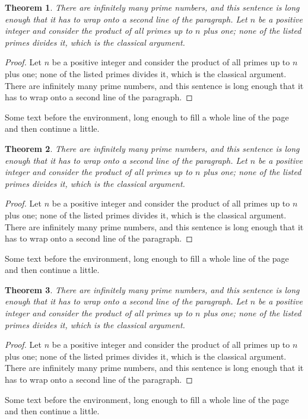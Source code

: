 \documentclass{article}
\newtheorem{theorem}{Theorem}
\begin{document}
\begin{theorem}
There are infinitely many prime numbers, and this sentence is long enough that it has to wrap onto a second line of the paragraph. Let $n$ be a positive integer and consider the product of all primes up to $n$ plus one; none of the listed primes divides it, which is the classical argument.
\end{theorem}
\begin{proof}
Let $n$ be a positive integer and consider the product of all primes up to $n$ plus one; none of the listed primes divides it, which is the classical argument. There are infinitely many prime numbers, and this sentence is long enough that it has to wrap onto a second line of the paragraph.
\end{proof}
Some text before the environment, long enough to fill a whole line of the page and then continue a little.

\begin{theorem}
There are infinitely many prime numbers, and this sentence is long enough that it has to wrap onto a second line of the paragraph. Let $n$ be a positive integer and consider the product of all primes up to $n$ plus one; none of the listed primes divides it, which is the classical argument.
\end{theorem}
\begin{proof}
Let $n$ be a positive integer and consider the product of all primes up to $n$ plus one; none of the listed primes divides it, which is the classical argument. There are infinitely many prime numbers, and this sentence is long enough that it has to wrap onto a second line of the paragraph.
\end{proof}
Some text before the environment, long enough to fill a whole line of the page and then continue a little.

\begin{theorem}
There are infinitely many prime numbers, and this sentence is long enough that it has to wrap onto a second line of the paragraph. Let $n$ be a positive integer and consider the product of all primes up to $n$ plus one; none of the listed primes divides it, which is the classical argument.
\end{theorem}
\begin{proof}
Let $n$ be a positive integer and consider the product of all primes up to $n$ plus one; none of the listed primes divides it, which is the classical argument. There are infinitely many prime numbers, and this sentence is long enough that it has to wrap onto a second line of the paragraph.
\end{proof}
Some text before the environment, long enough to fill a whole line of the page and then continue a little.
\end{document}
